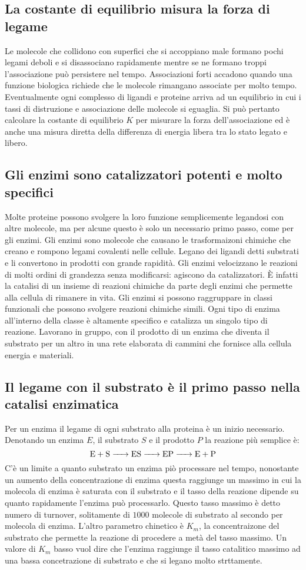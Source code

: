 \subsection{La costante di equilibrio misura la forza di legame}
Le molecole che collidono con superfici che si accoppiano male formano pochi legami deboli e si disassociano rapidamente mentre se ne formano troppi l'associazione pu\`o persistere
nel tempo. Associazioni forti accadono quando una funzione biologica richiede che le molecole rimangano associate per molto tempo. Eventualmente ogni complesso di ligandi e proteine
arriva ad un equilibrio in cui i tassi di distruzione e associazione delle molecole si eguaglia. Si pu\`o pertanto calcolare la costante di equilibrio $K$ per misurare la forza 
dell'associazione ed \`e anche una misura diretta della differenza di energia libera tra lo stato legato e libero. 
\subsection{Gli enzimi sono catalizzatori potenti e molto specifici}
Molte proteine possono svolgere la loro funzione semplicemente legandosi con altre molecole, ma per alcune questo \`e solo un necessario primo passo, come per gli enzimi. Gli enzimi sono
molecole che causano le trasformaizoni chimiche che creano e rompono legami covalenti nelle cellule. Legano dei ligandi detti substrati e li convertono in prodotti con grande rapidit\`a.
Gli enzimi velocizzano le reazioni di molti ordini di grandezza senza modificarsi: agiscono da catalizzatori. \`E infatti la catalisi di un insieme di reazioni chimiche da parte degli
enzimi che permette alla cellula di rimanere in vita. Gli enzimi si possono raggruppare in classi funzionali che possono svolgere reazioni chimiche simili. Ogni tipo di enzima 
all'interno della classe \`e altamente specifico e catalizza un singolo tipo di reazione. Lavorano in gruppo, con il prodotto di un enzima che diventa il substrato per un altro in una
rete elaborata di cammini che fornisce alla cellula energia e materiali.
\subsection{Il legame con il substrato \`e il primo passo nella catalisi enzimatica}
Per un enzima il legame di ogni substrato alla proteina \`e un inizio necessario. Denotando un enzima $E$, il substrato $S$ e il prodotto $P$ la reazione pi\`u semplice \`e:
$$\ce{E + S -> ES -> EP -> E + P}$$
C'\`e un limite a quanto substrato un enzima pi\`o processare nel tempo, nonostante un aumento della concentrazione di enzima questa raggiunge un massimo in cui la molecola di enzima 
\`e saturata con il substrato e il tasso della reazione dipende su quanto rapidamente l'enzima pu\`o processarlo. Questo tasso massimo \`e detto numero di turnover, solitamente di 
$1000$ molecole di substrato al secondo per molecola di enzima. L'altro parametro chinetico \`e $K_m$, la concentraizone del substrato che permette la reazione di procedere a met\`a 
del tasso massimo. Un valore di $K_m$ basso vuol dire che l'enzima raggiunge il tasso catalitico massimo ad una bassa concetrazione di substrato e che si legano molto strttamente. 
